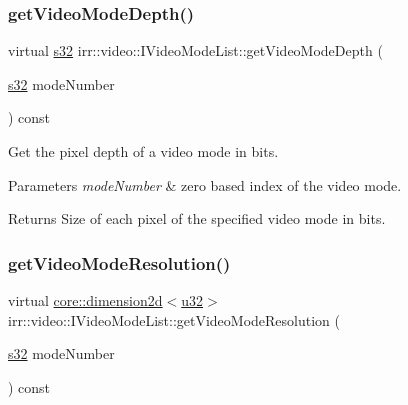 \subsubsection{\texorpdfstring{get\+Video\+Mode\+Depth()}{getVideoModeDepth()}\hspace{0.1cm}{\footnotesize\ttfamily [2/2]}}
{\footnotesize\ttfamily virtual \hyperlink{namespaceirr_ac66849b7a6ed16e30ebede579f9b47c6}{s32} irr\+::video\+::\+I\+Video\+Mode\+List\+::get\+Video\+Mode\+Depth (\begin{DoxyParamCaption}\item[{\hyperlink{namespaceirr_ac66849b7a6ed16e30ebede579f9b47c6}{s32}}]{mode\+Number }\end{DoxyParamCaption}) const\hspace{0.3cm}{\ttfamily [pure virtual]}}



Get the pixel depth of a video mode in bits. 


\begin{DoxyParams}{Parameters}
{\em mode\+Number} & zero based index of the video mode. \\
\hline
\end{DoxyParams}
\begin{DoxyReturn}{Returns}
Size of each pixel of the specified video mode in bits. 
\end{DoxyReturn}
\mbox{\label{classirr_1_1video_1_1IVideoModeList_af8409c756780c3566c94596cf7f94fc3}} 
\subsubsection{\texorpdfstring{get\+Video\+Mode\+Resolution()}{getVideoModeResolution()}\hspace{0.1cm}{\footnotesize\ttfamily [1/4]}}
{\footnotesize\ttfamily virtual \hyperlink{classirr_1_1core_1_1dimension2d}{core\+::dimension2d}$<$\hyperlink{namespaceirr_a0416a53257075833e7002efd0a18e804}{u32}$>$ irr\+::video\+::\+I\+Video\+Mode\+List\+::get\+Video\+Mode\+Resolution (\begin{DoxyParamCaption}\item[{\hyperlink{namespaceirr_ac66849b7a6ed16e30ebede579f9b47c6}{s32}}]{mode\+Number }\end{DoxyParamCaption}) const\hspace{0.3cm}{\ttfamily [pure virtual]}}



